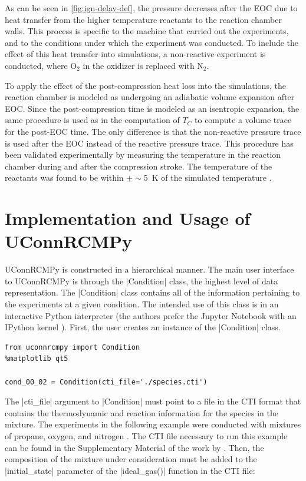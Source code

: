 \documentclass[12pt]{../ussci}
\begin{document}
As can be seen in \cref{fig:ign-delay-def}, the pressure
decreases after the EOC due to heat transfer from the higher temperature
reactants to the reaction chamber walls. This process is specific to the
machine that carried out the experiments, and to the conditions under
which the experiment was conducted. To include the effect of this heat
transfer into simulations, a non-reactive experiment is conducted, where
\(\text{O}_2\) in the oxidizer is replaced with \(\text{N}_2\).

To apply the effect of the post-compression heat loss into the simulations, the
reaction chamber is modeled as undergoing an adiabatic volume expansion after
EOC. Since the post-compression time is modeled as an isentropic expansion, the
same procedure is used as in the computation of \(T_C\) to compute a volume
trace for the post-EOC time. The only difference is that the non-reactive
pressure trace is used after the EOC instead of the reactive pressure trace.
This procedure has been validated experimentally by measuring the temperature in
the reaction chamber during and after the compression stroke. The temperature of
the reactants was found to be within $\pm\sim $\SI{5}{\K} of the simulated
temperature \autocite{Das2012a,Uddi2012}.

\section{Implementation and Usage of UConnRCMPy}\label{implementation-and-usage-of-uconnrcmpy}

UConnRCMPy is constructed in a hierarchical manner. The main user interface to
UConnRCMPy is through the \python|Condition| class, the highest level of data
representation. The \python|Condition| class contains all of the information
pertaining to the experiments at a given condition. The intended use of this
class is in an interactive Python interpreter (the authors prefer the Jupyter
Notebook with an IPython kernel \autocite{Perez2007}). First, the user creates
an instance of the \python|Condition| class.

\begin{verbatim}
from uconnrcmpy import Condition
%matplotlib qt5

cond_00_02 = Condition(cti_file='./species.cti')
\end{verbatim}

The \python|cti_file| argument to \python|Condition| must point to a file in the
CTI format that contains the thermodynamic and reaction information for the
species in the mixture. The experiments in the following example were conducted
with mixtures of propane, oxygen, and nitrogen \autocite{Dames2016}. The CTI
file necessary to run this example can be found in the Supplementary Material of
the work by \textcite{Dames2016}. Then, the composition of the mixture under
consideration must be added to the \python|initial_state| parameter of the
\python|ideal_gas()| function in the CTI file:
\end{document}
